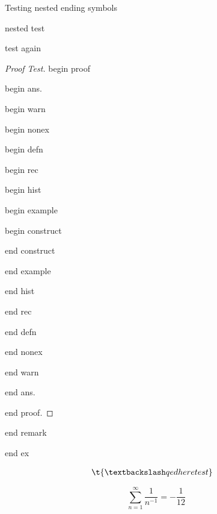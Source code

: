 \documentclass{article}
\numberwithin{thm}{section}
\numberwithin{prob}{section}
\numberwithin{equation}{section}
\begin{document}
Testing nested ending symbols
\begin{ex}\label{ex}
    nested test
    \begin{rem}[stuff]\label{rem}
        test again
        \begin{proof}[Proof Test]
            begin proof
            \begin{ans}[Parenthetical]
                begin ans.
                \begin{warn}\label{warn}
                    begin warn
                    \begin{nonex}
                        begin nonex
                        \begin{defn}
                            begin defn
                            \begin{rec}
                                begin rec
                                \begin{hist}
                                    begin hist
                                    \begin{example}
                                        begin example
                                        \begin{construct}
                                            begin construct

                                            end construct
                                        \end{construct}
                                        end example
                                    \end{example}
                                    end hist
                                \end{hist}
                                end rec
                            \end{rec}
                            end defn
                        \end{defn}
                        end nonex
                    \end{nonex}
                    end warn
                \end{warn}
                end ans.
            \end{ans}
            end proof.
        \end{proof}
        end remark
    \end{rem}
    end ex
\end{ex}
\begin{ex}\label{ex:qed}
    \begin{align*}
        \t{\textbackslash qedhere test} &\qedhere
    \end{align*}
\end{ex}
\begin{equation}\label{eqn}
    \sum_{n=1}^\infty \frac1{n^{-1}} = -\frac1{12}
\end{equation}
\end{document}
